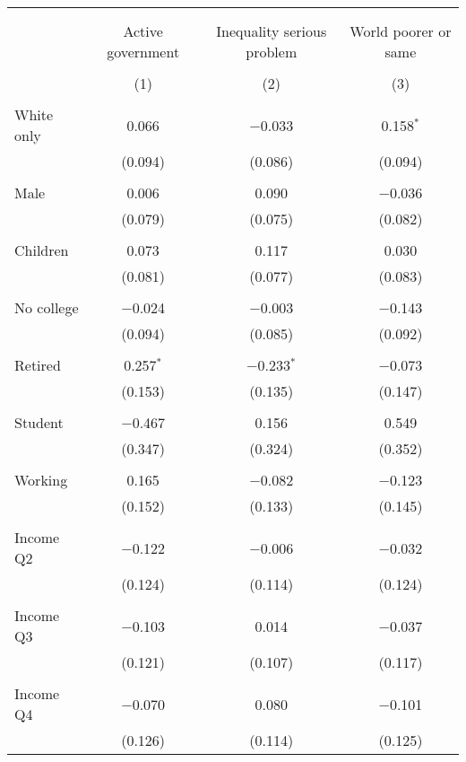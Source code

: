 
\begin{tabular}{@{\extracolsep{5pt}}lccc} 
\\[-1.8ex]\hline 
\hline \\[-1.8ex] 
\\[-1.8ex] & Active government & Inequality serious problem & World poorer or same \\ 
\\[-1.8ex] & (1) & (2) & (3)\\ 
\hline \\[-1.8ex] 
 White only & 0.066 & $-$0.033 & 0.158$^{*}$ \\ 
  & (0.094) & (0.086) & (0.094) \\ 
  & & & \\ 
 Male & 0.006 & 0.090 & $-$0.036 \\ 
  & (0.079) & (0.075) & (0.082) \\ 
  & & & \\ 
 Children & 0.073 & 0.117 & 0.030 \\ 
  & (0.081) & (0.077) & (0.083) \\ 
  & & & \\ 
 No college & $-$0.024 & $-$0.003 & $-$0.143 \\ 
  & (0.094) & (0.085) & (0.092) \\ 
  & & & \\ 
 Retired & 0.257$^{*}$ & $-$0.233$^{*}$ & $-$0.073 \\ 
  & (0.153) & (0.135) & (0.147) \\ 
  & & & \\ 
 Student & $-$0.467 & 0.156 & 0.549 \\ 
  & (0.347) & (0.324) & (0.352) \\ 
  & & & \\ 
 Working & 0.165 & $-$0.082 & $-$0.123 \\ 
  & (0.152) & (0.133) & (0.145) \\ 
  & & & \\ 
 Income Q2 & $-$0.122 & $-$0.006 & $-$0.032 \\ 
  & (0.124) & (0.114) & (0.124) \\ 
  & & & \\ 
 Income Q3 & $-$0.103 & 0.014 & $-$0.037 \\ 
  & (0.121) & (0.107) & (0.117) \\ 
  & & & \\ 
 Income Q4 & $-$0.070 & 0.080 & $-$0.101 \\ 
  & (0.126) & (0.114) & (0.125) \\ 

\end{tabular}
